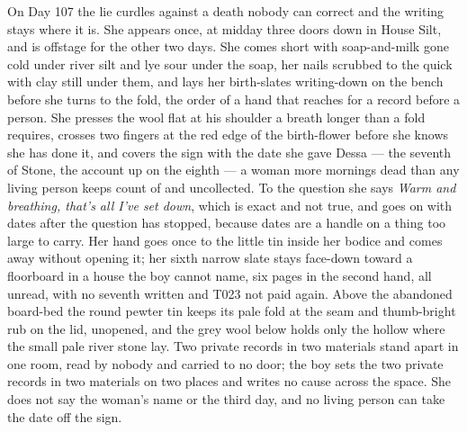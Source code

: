 \documentclass{design/chronicle}
\begin{document}
{On Day 107 the lie curdles against a death nobody can correct and the writing stays where it is. She appears once, at midday three doors down in House Silt, and is offstage for the other two days. She comes short with soap-and-milk gone cold under river silt and lye sour under the soap, her nails scrubbed to the quick with clay still under them, and lays her birth-slates writing-down on the bench before she turns to the fold, the order of a hand that reaches for a record before a person. She presses the wool flat at his shoulder a breath longer than a fold requires, crosses two fingers at the red edge of the birth-flower before she knows she has done it, and covers the sign with the date she gave Dessa — the seventh of Stone, the account up on the eighth — a woman more mornings dead than any living person keeps count of and uncollected. To the question she says \emph{Warm and breathing, that’s all I’ve set down}, which is exact and not true, and goes on with dates after the question has stopped, because dates are a handle on a thing too large to carry. Her hand goes once to the little tin inside her bodice and comes away without opening it; her sixth narrow slate stays face-down toward a floorboard in a house the boy cannot name, six pages in the second hand, all unread, with no seventh written and T023 not paid again. Above the abandoned board-bed the round pewter tin keeps its pale fold at the seam and thumb-bright rub on the lid, unopened, and the grey wool below holds only the hollow where the small pale river stone lay. Two private records in two materials stand apart in one room, read by nobody and carried to no door; the boy sets the two private records in two materials on two places and writes no cause across the space. She does not say the woman’s name or the third day, and no living person can take the date off the sign.

}
\end{document}

